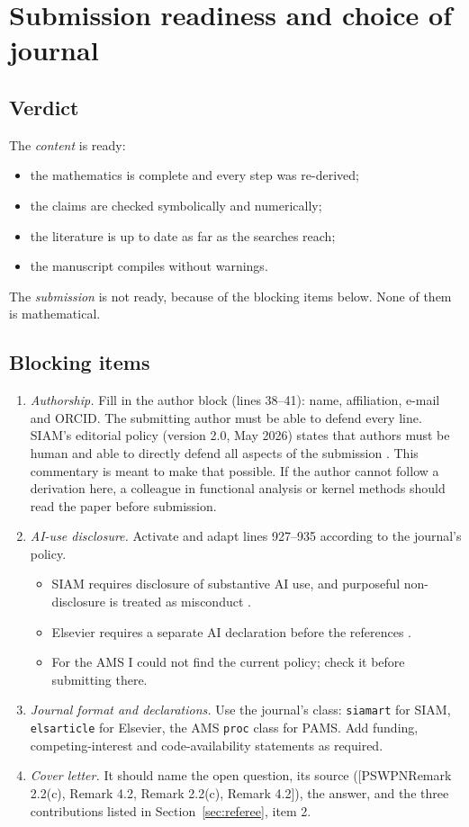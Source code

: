 \documentclass[11pt]{amsart}
\newcommand{\PS}[1][]{[PSWPN\ifx\relax#1\relax\else, #1\fi]}
\begin{document}
\section{Submission readiness and choice of journal}\label{sec:ready}

\subsection{Verdict}
The \emph{content} is ready:
\begin{itemize}
\item the mathematics is complete and every step was re-derived;
\item the claims are checked symbolically and numerically;
\item the literature is up to date as far as the searches reach;
\item the manuscript compiles without warnings.
\end{itemize}
The \emph{submission} is not ready, because of the blocking items below. None of them is mathematical.

\subsection{Blocking items}
\begin{enumerate}
\item \emph{Authorship.} Fill in the author block (lines 38--41): name, affiliation, e-mail and ORCID. The submitting
author must be able to defend every line. SIAM's editorial policy (version 2.0, May 2026) states that authors must be
human and able to directly defend all aspects of the submission \cite{src-siam-ai}. This commentary is meant to make
that possible. If the author cannot follow a derivation here, a colleague in functional analysis or kernel methods
should read the paper before submission.
\item \emph{AI-use disclosure.} Activate and adapt lines 927--935 according to the journal's policy.
\begin{itemize}
\item SIAM requires disclosure of substantive AI use, and purposeful non-disclosure is treated as misconduct
\cite{src-siam-ai,src-siam-news}.
\item Elsevier requires a separate AI declaration before the references \cite{src-elsevier}.
\item For the AMS I could not find the current policy; check it before submitting there.
\end{itemize}
\item \emph{Journal format and declarations.} Use the journal's class: \texttt{siamart} for SIAM, \texttt{elsarticle}
for Elsevier, the AMS \texttt{proc} class for PAMS. Add funding, competing-interest and code-availability statements as
required.
\item \emph{Cover letter.} It should name the open question, its source (\PS[Remark 2.2(c), Remark 4.2]), the answer,
and the three contributions listed in Section~\ref{sec:referee}, item 2.
\end{enumerate}
\end{document}
